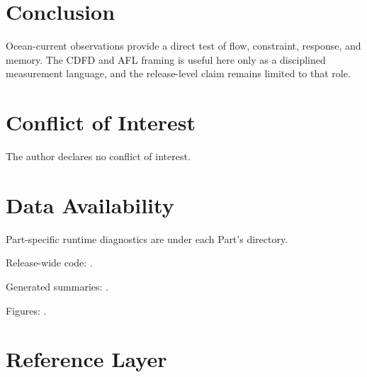 \documentclass[12pt,a4paper]{article}
\begin{document}
\section{Conclusion}

Ocean-current observations provide a direct test of flow, constraint, response,
and memory. The CDFD and AFL framing is useful here only as a disciplined
measurement language, and the release-level claim remains limited to that role.

\section*{Conflict of Interest}
The author declares no conflict of interest.

\section*{Data Availability}
Part-specific runtime diagnostics are under each Part's  directory.

Release-wide code: .

Generated summaries: .

Figures: .


\section{Reference Layer}



\end{document}
